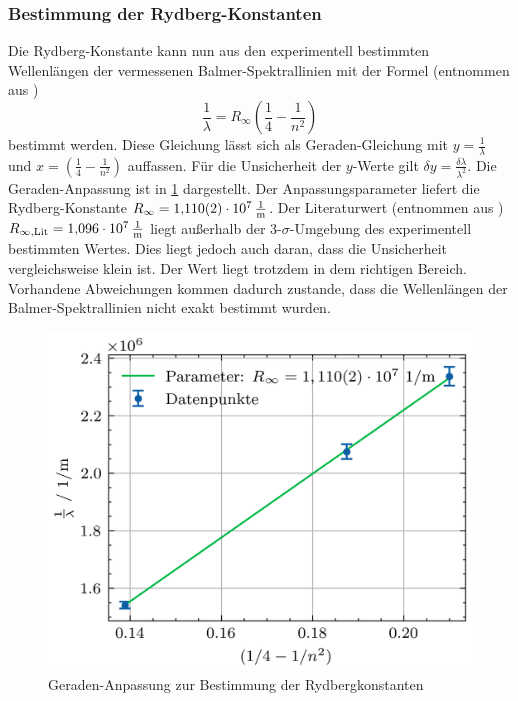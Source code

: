 \subsubsection{Bestimmung der Rydberg-Konstanten}\label{subsubsec:rydberg}
Die Rydberg-Konstante kann nun aus den experimentell bestimmten Wellenlängen der vermessenen Balmer-Spektrallinien mit der Formel (entnommen aus \cite{balmer_handblatt})
\begin{equation*}
    \frac{1}{\lambda} = R_{\infty} \left(\frac{1}{4} - \frac{1}{n^2}\right)
\end{equation*} bestimmt werden. Diese Gleichung lässt sich als Geraden-Gleichung mit $y = \frac{1}{\lambda}$ und $x = \left(\frac{1}{4} - \frac{1}{n^2}\right)$
auffassen. Für die Unsicherheit der $y$-Werte gilt $\delta y = \frac{\delta \lambda}{\lambda^2}$. Die Geraden-Anpassung ist in \cref{fig:geraden_fit_rydbergkonstante}
dargestellt. Der Anpassungsparameter liefert die Rydberg-Konstante $R_{\infty} = \SI{1,110(2)e7}{\frac{1}{\meter}}$.
Der Literaturwert (entnommen aus \cite{Demtröder:829119}) $R_{\infty,\mathrm{Lit}} = \SI{1,096e7}{\frac{1}{\meter}}$ liegt außerhalb der 3-$\sigma$-Umgebung des experimentell bestimmten Wertes.
Dies liegt jedoch auch daran, dass die Unsicherheit vergleichsweise klein ist. Der Wert liegt trotzdem in dem richtigen Bereich. Vorhandene Abweichungen kommen dadurch zustande,
dass die Wellenlängen der Balmer-Spektrallinien nicht exakt bestimmt wurden.
\begin{figure}[H]
	\centering
	\includegraphics[width=0.8\linewidth]{../figs/rydbergkonstante_fit.png}
	\caption{Geraden-Anpassung zur Bestimmung der Rydbergkonstanten}
	\label{fig:geraden_fit_rydbergkonstante}
\end{figure}
